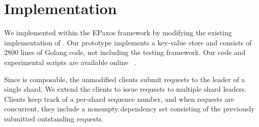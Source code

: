 \section{Implementation}
\label{sec:implementation}

We implemented \mdl within the EPaxos framework by modifying the existing implementation of \mpaxos. Our prototype implements a key-value store and consists of 2800 lines of Golang code, not including the testing framework. Our code and experimental scripts are available online ~\cite{code22}. 


Since \sdl is composable, the unmodified \mpaxos clients submit requests to the leader of a single shard. We extend the clients to issue requests to multiple shard leaders. Clients keep track of a per-shard sequence number, and when requests are concurrent, they include a nonempty dependency set consisting of the previously submitted outstanding requests.